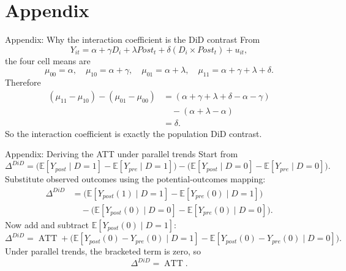 \documentclass[10pt]{beamer}
\newcommand{\E}{\mathbb{E}}
\newcommand{\ATT}{\operatorname{ATT}}
\begin{document}
\appendix

\section*{Appendix}

\begin{frame}{Appendix: Why the interaction coefficient is the DiD contrast}
\label{app:did-reg}
\small
From
\[
Y_{it} = \alpha + \gamma D_i + \lambda Post_t + \delta(D_i\times Post_t)+u_{it},
\]
the four cell means are
\[
\mu_{00}=\alpha,\quad
\mu_{10}=\alpha+\gamma,\quad
\mu_{01}=\alpha+\lambda,\quad
\mu_{11}=\alpha+\gamma+\lambda+\delta.
\]
Therefore
\begin{align*}
(\mu_{11}-\mu_{10})-(\mu_{01}-\mu_{00})
&=
(\alpha+\gamma+\lambda+\delta-\alpha-\gamma) \\
&\quad -(\alpha+\lambda-\alpha) \\
&= \delta.
\end{align*}
So the interaction coefficient is exactly the population DiD contrast.
\hfill\hyperlink{slide:did_reg}{}
\end{frame}

\begin{frame}{Appendix: Deriving the ATT under parallel trends}
\label{app:did-att}
\small
Start from
\[
\Delta^{DiD}
=
\Big(\E[Y_{post}\mid D=1]-\E[Y_{pre}\mid D=1]\Big)
-\Big(\E[Y_{post}\mid D=0]-\E[Y_{pre}\mid D=0]\Big).
\]
Substitute observed outcomes using the potential-outcomes mapping:
\begin{align*}
\Delta^{DiD}
&=
\Big(\E[Y_{post}(1)\mid D=1]-\E[Y_{pre}(0)\mid D=1]\Big) \\
&\quad -\Big(\E[Y_{post}(0)\mid D=0]-\E[Y_{pre}(0)\mid D=0]\Big).
\end{align*}
Now add and subtract $\E[Y_{post}(0)\mid D=1]$:
\[
\Delta^{DiD}
=
\ATT
+
\Big(
\E[Y_{post}(0)-Y_{pre}(0)\mid D=1]
-\E[Y_{post}(0)-Y_{pre}(0)\mid D=0]
\Big).
\]
Under parallel trends, the bracketed term is zero, so
\[
\Delta^{DiD}=\ATT.
\]
\hfill\hyperlink{slide:did_att_bridge}{}
\end{frame}
\end{document}
